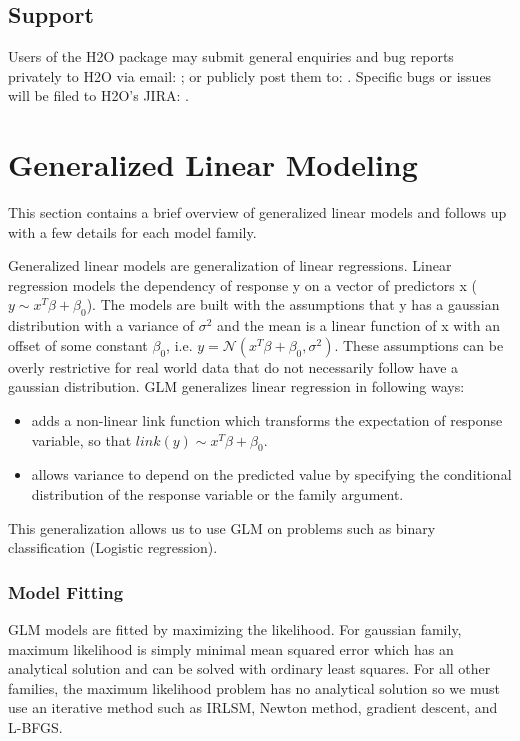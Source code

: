 \documentclass[11pt]{article}
\begin{document}
\subsection{Support} 

Users of the H2O package may submit general enquiries and bug reports privately to H2O via email: ; or publicly post them to: . Specific bugs or issues will be filed to H2O's JIRA: 
.

\section{Generalized Linear Modeling} 
This section contains a brief overview of generalized linear models and follows up with a few details for each model family.

Generalized linear models are generalization of linear regressions. Linear regression models the dependency of response y on a vector of predictors x ($y \sim x^T \beta + \beta_0$). The models are built with the assumptions that y has a gaussian distribution with a variance of $\sigma^2$ and the mean is a linear function of x with an offset of some constant $\beta_0$, i.e. $ y = \mathcal{N}(x^T \beta + \beta_0 ,  \sigma^2) $. These assumptions can be overly restrictive for real world data that do not necessarily follow have a gaussian distribution. GLM generalizes linear regression in following ways: 
\begin{itemize} 
\item adds a non-linear link function which transforms the expectation of response variable, so that $link(y) \sim x^T \beta + \beta_0$.
\item allows variance to depend on the predicted value by specifying the conditional distribution of the response variable or the family argument.

\end{itemize}
This generalization allows us to use GLM on problems such as binary classification (Logistic regression).

\subsubsection{Model Fitting}
GLM models are fitted by maximizing the likelihood. For gaussian family, maximum likelihood is simply minimal mean squared error which has an analytical solution and can be solved with ordinary least squares. For all other families, the maximum likelihood problem has no analytical solution so we must use an iterative method such as IRLSM, Newton method, gradient descent, and L-BFGS.
\end{document}
